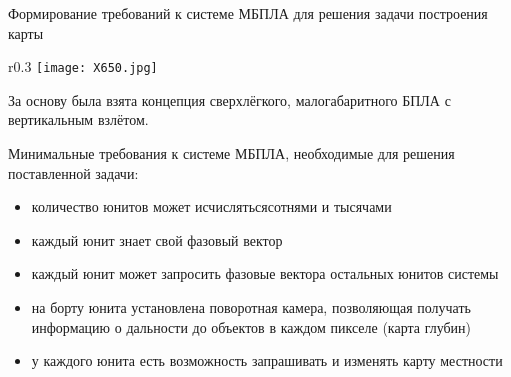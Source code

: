 \begin{tslide}{Формирование требований к системе МБПЛА для решения задачи построения карты}

    \begin{wrapfigure}{r}{0.3\textwidth}
        \vspace{-1cm}
        \texttt{[image: X650.jpg]}
        \vspace{-3cm}
    \end{wrapfigure}

    За основу была взята концепция сверхлёгкого, малогабаритного БПЛА
    с вертикальным взлётом.

    Минимальные требования к системе МБПЛА,
    необходимые для решения поставленной задачи:
    \begin{itemize}
    \item количество юнитов может исчисляться\newline сотнями и тысячами
    \item каждый юнит знает свой фазовый вектор
    \item каждый юнит может запросить фазовые вектора остальных юнитов системы
    \item на борту юнита установлена поворотная камера,
        позволяющая получать информацию о дальности до объектов в каждом пикселе (карта глубин)

    \item у каждого юнита есть возможность запрашивать и изменять карту местности
    \end{itemize}

\end{tslide}

